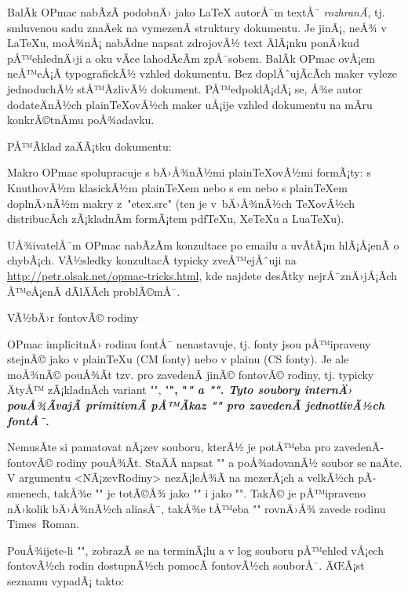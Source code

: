 BalÃ­k OPmac nabÃ­zÃ­ podobnÄ› jako \LaTeX{} autorÅ¯m textÅ¯ {\it rozhranÃ­}, tj.
smluvenou sadu znaÄek na vymezenÃ­ struktury dokumentu. Je jinÃ¡, neÅ¾ v
\LaTeX{}u, moÅ¾nÃ¡ nabÃ­dne napsat zdrojovÃ½ text ÄlÃ¡nku ponÄ›kud pÅ™ehlednÄ›ji a
oku vÃ­ce lahodÃ­cÃ­m zpÅ¯sobem. BalÃ­k OPmac ovÅ¡em neÅ™eÅ¡Ã­ typografickÃ½ vzhled
dokumentu. Bez doplÅˆujÃ­cÃ­ch maker vyleze jednoduchÃ½ stÅ™Ã­zlivÃ½ dokument.
PÅ™edpoklÃ¡dÃ¡ se, Å¾e autor dodateÄnÃ½ch plain\TeX{}ovÃ½ch maker uÅ¡ije vzhled
dokumentu na mÃ­ru konkrÃ©tnÃ­mu poÅ¾adavku.

PÅ™Ã­klad zaÄÃ¡tku dokumentu:

\begtt
\chyph              %
\fontfam [LM fonts] %
\typosize[12/14]    %
\endtt

Makro OPmac spolupracuje s bÄ›Å¾nÃ½mi plain\TeX{}ovÃ½mi formÃ¡ty: s KnuthovÃ½m
klasickÃ½m \hbox{plain}\TeX{}em nebo s \csplain{}em nebo s plain\TeX{}em
doplnÄ›nÃ½m makry z~"etex.src" (ten je v~bÄ›Å¾nÃ½ch \TeX{}ovÃ½ch distribucÃ­ch 
zÃ¡kladnÃ­m formÃ¡tem pdf\TeX{}u, Xe\TeX{}u a Lua\TeX{}u). 

UÅ¾ivatelÅ¯m OPmac nabÃ­zÃ­m konzultace po emailu a uvÃ­tÃ¡m hlÃ¡Å¡enÃ­ o chybÃ¡ch.
VÃ½sledky konzultacÃ­ typicky zveÅ™ejÅˆuji na
\url{http://petr.olsak.net/opmac-tricks.html}, kde najdete desÃ­tky
nejrÅ¯znÄ›jÅ¡Ã­ch Å™eÅ¡enÃ­ dÃ­lÄÃ­ch problÃ©mÅ¯.


\sec VÃ½bÄ›r fontovÃ© rodiny

OPmac implicitnÄ› rodinu fontÅ¯ nenastavuje, tj. fonty jsou pÅ™ipraveny stejnÃ©
jako v plainTeXu (CM fonty) nebo v \CS{}plainu (CS fonty). Je ale moÅ¾nÃ© 
pouÅ¾Ã­t tzv.  pro zavedenÃ­ jinÃ© fontovÃ© rodiny, tj.
typicky ÄtyÅ™ zÃ¡kladnÃ­ch variant "\rm", "\bf", "\it" a "\bi". Tyto soubory
internÄ› pouÅ¾Ã­vajÃ­ primitivnÃ­ pÅ™Ã­kaz "\font" pro zavedenÃ­ jednotlivÃ½ch fontÅ¯.

NemusÃ­te si pamatovat nÃ¡zev souboru, kterÃ½ je potÅ™eba pro zavedenÃ­ fontovÃ©
rodiny pouÅ¾Ã­t. StaÄÃ­ napsat "\fontfam[<NÃ¡zevRodiny>]" a poÅ¾adovanÃ½
soubor se naÄte. V argumentu <NÃ¡zevRodiny> nezÃ¡leÅ¾Ã­ na mezerÃ¡ch a velkÃ½ch
pÃ­smenech, takÅ¾e "" je totÃ©Å¾ jako
"\fontfam[TimesRoman]" i jako "\fontfam[timesroman]". TakÃ© je pÅ™ipraveno
nÄ›kolik bÄ›Å¾nÃ½ch aliasÅ¯, takÅ¾e tÅ™eba "\fontfam[times]" rovnÄ›Å¾ zavede rodinu
Times~Roman.

PouÅ¾ijete-li "\fontfam[?]", zobrazÃ­ se na terminÃ¡lu a v log souboru pÅ™ehled
vÅ¡ech fontovÃ½ch rodin dostupnÃ½ch pomocÃ­ fontovÃ½ch souborÅ¯. ÄŒÃ¡st seznamu vypadÃ¡
takto:

